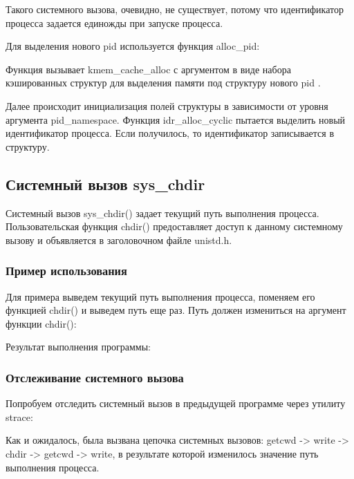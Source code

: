 \documentclass[14pt,a4paper,report]{report}
\begin{document}
Такого системного вызова, очевидно, не существует, потому что идентификатор процесса задается единожды при запуске процесса.

Для выделения нового pid используется функция alloc\_pid:



Функция вызывает kmem\_cache\_alloc с аргументом в виде набора кэшированных структур для выделения памяти под структуру нового pid \cite{cite-pid-alloc}.

Далее происходит инициализация полей структуры в зависимости от уровня аргумента pid\_namespace. Функция idr\_alloc\_cyclic пытается выделить новый идентификатор процесса. Если получилось, то идентификатор записывается в структуру.

\subsection{Системный вызов sys\_chdir}

Системный вызов sys\_chdir() задает текущий путь выполнения процесса. Пользовательская функция chdir() предоставляет доступ к данному системному вызову и объявляется в заголовочном файле unistd.h.

\subsubsection{Пример использования}

Для примера выведем текущий путь выполнения процесса, поменяем его функцией chdir() и выведем путь еще раз. Путь должен измениться на аргумент функции chdir():



Результат выполнения программы:



\subsubsection{Отслеживание системного вызова}

Попробуем отследить системный вызов в предыдущей программе через утилиту strace:



Как и ожидалось, была вызвана цепочка системных вызовов: getcwd -> write -> chdir -> getcwd -> write, в результате которой изменилось значение путь выполнения процесса.
\end{document}
